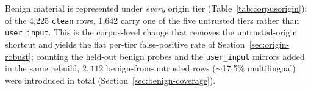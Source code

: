 \documentclass{article}
\begin{document}
Benign material is represented under \emph{every} origin tier (Table~\ref{tab:corpusorigin}): of the 4{,}225 \texttt{clean} rows, 1{,}642 carry one of the five untrusted tiers rather than \texttt{user\_input}. This is the corpus-level change that removes the untrusted-origin shortcut and yields the flat per-tier false-positive rate of Section~\ref{sec:origin-robust}; counting the held-out benign probes and the \texttt{user\_input} mirrors added in the same rebuild, $2{,}112$ benign-from-untrusted rows ($\sim$17.5\% multilingual) were introduced in total (Section~\ref{sec:benign-coverage}).
\end{document}
